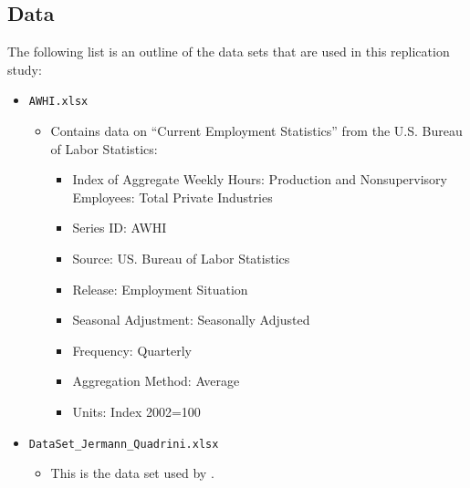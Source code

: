 \subsection{Data}
\label{sec:appendix_data}


The following list is an outline of the data sets that are used in this replication study:


\begin{itemize}
\item \texttt{AWHI.xlsx} 
	\begin{itemize}
		\item Contains data on ``Current Employment Statistics'' from the U.S. Bureau of Labor Statistics:
		\begin{itemize} 
		 	\item Index of Aggregate Weekly Hours: Production and Nonsupervisory Employees: Total Private Industries
			\item Series ID: AWHI
			\item Source: US. Bureau of Labor Statistics
			\item Release: Employment Situation
			\item Seasonal Adjustment: Seasonally Adjusted
			\item Frequency: Quarterly
			\item Aggregation Method: Average
			\item Units: Index 2002=100
		\end{itemize}
	\end{itemize}

\item \texttt{DataSet\_Jermann\_Quadrini.xlsx}
	\begin{itemize}
		\item This is the data set used by \cite{JERMANNfinancial}.
	\end{itemize}


\end{itemize}
